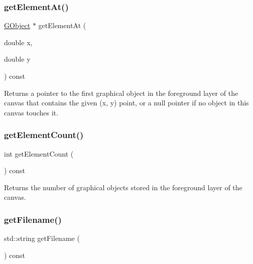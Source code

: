 \subsubsection{\texorpdfstring{get\+Element\+At()}{getElementAt()}}
{\footnotesize\ttfamily \mbox{\hyperlink{classsgl_1_1GObject}{G\+Object}} $\ast$ get\+Element\+At (\begin{DoxyParamCaption}\item[{double}]{x,  }\item[{double}]{y }\end{DoxyParamCaption}) const\hspace{0.3cm}{\ttfamily [virtual]}}



Returns a pointer to the first graphical object in the foreground layer of the canvas that contains the given (x, y) point, or a null pointer if no object in this canvas touches it. 

\mbox{\label{classsgl_1_1GCanvas_adf7d37ec315f859648def92e6b32408f}} 
\subsubsection{\texorpdfstring{get\+Element\+Count()}{getElementCount()}}
{\footnotesize\ttfamily int get\+Element\+Count (\begin{DoxyParamCaption}{ }\end{DoxyParamCaption}) const\hspace{0.3cm}{\ttfamily [virtual]}}



Returns the number of graphical objects stored in the foreground layer of the canvas. 

\mbox{\label{classsgl_1_1GCanvas_a2011812670c3de9747702e3c052b6bb3}} 
\subsubsection{\texorpdfstring{get\+Filename()}{getFilename()}}
{\footnotesize\ttfamily std\+::string get\+Filename (\begin{DoxyParamCaption}{ }\end{DoxyParamCaption}) const\hspace{0.3cm}{\ttfamily [virtual]}}



